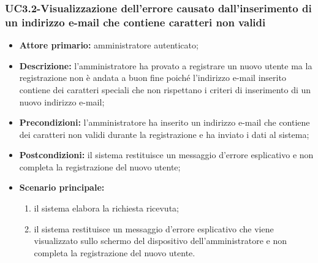 \subsubsection{UC3.2-Visualizzazione dell'errore causato dall'inserimento di un indirizzo e-mail che contiene caratteri non validi}
\begin{itemize}
	\item \textbf{Attore primario:} amministratore autenticato;

	\item \textbf{Descrizione:} l'amministratore ha provato a registrare un nuovo utente ma la registrazione non è andata a buon fine poiché l'indirizzo e-mail inserito contiene dei caratteri speciali che non rispettano i criteri di inserimento di un nuovo indirizzo e-mail;

	\item \textbf{Precondizioni:} l'amministratore ha inserito un indirizzo e-mail che contiene dei caratteri non validi durante la registrazione e ha inviato i dati al sistema;

	\item \textbf{Postcondizioni:} il sistema restituisce un messaggio d'errore esplicativo e non completa la registrazione del nuovo utente;

	\item \textbf{Scenario principale:}
	\begin{enumerate}
   		 \item il sistema elabora la richiesta ricevuta;
   		 \item il sistema restituisce un messaggio d'errore esplicativo che viene visualizzato sullo schermo del dispositivo dell'amministratore e non completa la registrazione del nuovo utente.
	\end{enumerate}
\end{itemize}

